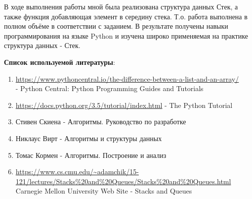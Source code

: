 \documentclass[12pt]{article}
\begin{document}
В ходе выполнения работы мной была реализована структура данных Стек, а также функция добавляющая элемент в середину стека. Т.о. работа выполнена в полном объёме в соответствии с заданием. В результате получены навыки программирования на языке Python и изучена широко применяемая на практике структура данных - Стек.
\par\bigskip
\textbf{Список используемой литературы}:
\begin{enumerate}


\item \url{https://www.pythoncentral.io/the-difference-between-a-list-and-an-array/} \\ - Python Central: Python Programming Guides and Tutorials

\item \url{https://docs.python.org/3.5/tutorial/index.html} - The Python Tutorial
\item Стивен Скиена - Алгоритмы. Руководство по разработке
\item Никлаус Вирт - Алгоритмы и структуры данных
\item Томас Кормен - Алгоритмы. Построение и анализ
\item \url{https://www.cs.cmu.edu/~adamchik/15-121/lectures/Stacks%20and%20Queues/Stacks%20and%20Queues.html} Carnegie Mellon University Web Site - Stacks and Queues
\end{enumerate}
\end{document}
